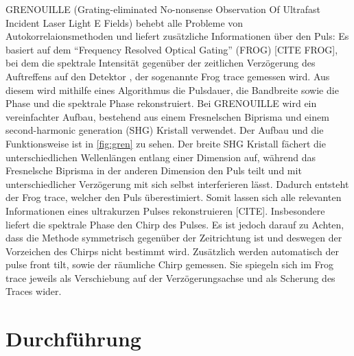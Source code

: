 \documentclass[twoside,        %
               BCOR12mm,       %
               english,ngerman, %
               fleqn,headsepline=false,footsepline=false
              ]{Vorlage/MFPREPORT}
\begin{document}
GRENOUILLE (Grating-eliminated No-nonsense Observation Of Ultrafast Incident
Laser Light E Fields) behebt alle Probleme von Autokorrelaionsmethoden und
liefert zusätzliche Informationen über den Puls: Es basiert auf dem ``Frequency
Resolved Optical Gating'' (FROG) [CITE FROG], bei dem die spektrale Intensität gegenüber
der zeitlichen Verzögerung des Auftreffens auf den Detektor , der sogenannte
Frog trace gemessen wird. Aus diesem wird mithilfe eines Algorithmus die
Pulsdauer, die Bandbreite sowie die Phase und die spektrale Phase
rekonstruiert. Bei GRENOUILLE wird ein vereinfachter Aufbau, bestehend aus
einem Fresnelschen Biprisma und einem second-harmonic generation (SHG) Kristall
verwendet. Der Aufbau und die Funktionsweise ist in \cref{fig:gren} zu sehen. Der breite SHG
Kristall fächert die unterschiedlichen Wellenlängen entlang einer Dimension
auf, während das Fresnelsche Biprisma in der anderen Dimension den Puls teilt
und mit unterschiedlicher Verzögerung mit sich selbst interferieren lässt.
Dadurch entsteht der Frog trace, welcher den Puls überestimiert. Somit lassen
sich alle relevanten Informationen eines ultrakurzen Pulses rekonstruieren
[CITE]. Insbesondere liefert die spektrale Phase den Chirp des Pulses. Es ist
jedoch darauf zu Achten, dass die Methode symmetrisch gegenüber der
Zeitrichtung ist und deswegen der Vorzeichen des Chirps nicht bestimmt wird.
Zusätzlich werden automatisch der pulse front tilt, sowie der räumliche Chirp
gemessen. Sie spiegeln sich im Frog trace jeweils als Verschiebung auf der
Verzögerungsachse und als Scherung des Traces wider.



\section{Durchführung}
\label{sec:durchfuehrung}
\end{document}
